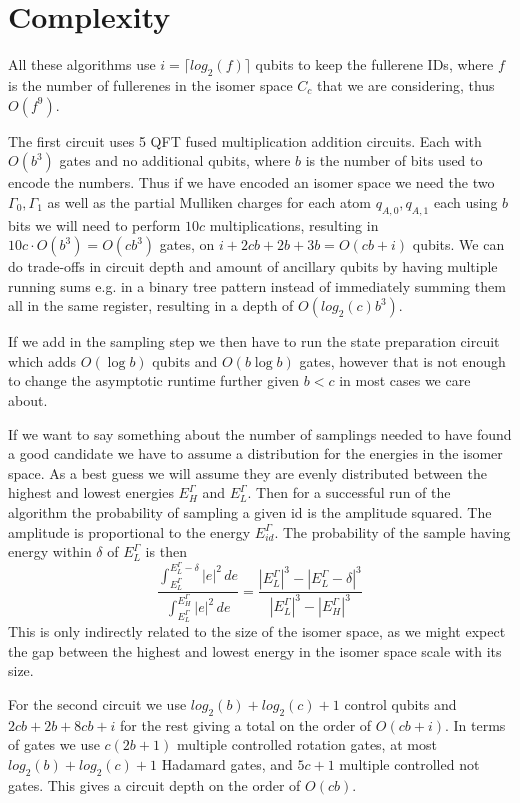 \section{Complexity}
All these algorithms use $i = \lceil log_2(f) \rceil$ qubits to keep the fullerene IDs, where $f$ is the number of fullerenes in the isomer space $C_c$ that we are considering, thus $O(f^9)$. 

The first circuit uses 5 QFT fused multiplication addition circuits. Each with $O(b^{3})$\cite{perez2017} gates and no additional qubits, where $b$ is the number of bits used to encode the numbers. Thus if we have encoded an isomer space we need the two $\varGamma_0,\varGamma_1$ as well as the partial Mulliken charges for each atom $q_{A,0},q_{A,1}$ each using $b$ bits we will need to perform $10c$ multiplications, resulting in $10c\cdot O(b^3)=O(cb^3)$ gates, on $i + 2cb + 2b + 3b = O(cb+i)$ qubits. We can do trade-offs in circuit depth and amount of ancillary qubits by having multiple running sums e.g. in a binary tree pattern instead of immediately summing them all in the same register, resulting in a depth of $O(log_2(c)b^3)$. 

If we add in the sampling step we then have to run the state preparation circuit which adds $O(\log b)$ qubits and $O(b\log b)$ gates\cite{wang2020}, however that is not enough to change the asymptotic runtime further given $b<c$ in most cases we care about. 

If we want to say something about the number of samplings needed to have found a good candidate we have to assume a distribution for the energies in the isomer space. As a best guess we will assume they are evenly distributed between the highest and lowest energies $E^\Gamma_H$ and $E^\Gamma_L$. Then for a successful run of the algorithm the probability of sampling a given id is the amplitude squared. The amplitude is proportional to the energy $E_{id}^\Gamma$. The probability of the sample having energy within $\delta$ of $E^\Gamma_L$ is then
\begin{equation}
    \frac{\int_{E^\Gamma_L}^{E^\Gamma_L-\delta}|e|^2 \,de}{\int_{E^\Gamma_L}^{E^\Gamma_H}|e|^2 \,de} = 
    \frac{|{E^\Gamma_L}|^3-|{E^\Gamma_L-\delta}|^3}{|{E^\Gamma_L}|^3-|{E^\Gamma_H}|^3}
    \label{eq:prob}
\end{equation}
This is only indirectly related to the size of the isomer space, as we might expect the gap between the highest and lowest energy in the isomer space scale with its size. 

For the second circuit we use $log_2(b)+log_2(c)+1$ control qubits and $2cb+2b+8cb+i$ for the rest giving a total on the order of $O(cb+i)$.
In terms of gates we use $c(2b+1)$ multiple controlled rotation gates, at most $log_2(b)+log_2(c)+1$ Hadamard gates, and $5c+1$ multiple controlled not gates. This gives a circuit depth on the order of $O(cb)$. 

